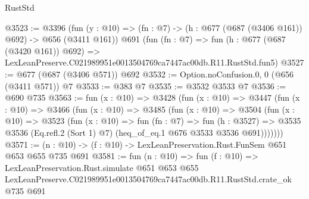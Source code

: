 \begin{lexlean}{RustStd}
\begin{coremodule}
@3523 := @3396
    (fun (y : @10) => (fn : @7) -> (h : @677 (@687 (@3406 @161)) @692) -> @656 (@3411 @161))
    @691
    (fun (fn : @7) =>
    fun (h : @677 (@687 (@3420 @161)) @692) =>
    LexLeanPreserve.C021989951e0013504769ca7447ac00db.R11.RustStd.fun5)
@3527 := @677 (@687 (@3406 @571)) @692
@3532 := Option.noConfusion.{0, 0} (@656 (@3411 @571)) @7
@3533 := @383 @7
@3535 := @3532 @3533 @7
@3536 := @690 @735
@3563 := fun (x : @10) =>
  @3428
    (fun (x : @10) =>
    @3447
      (fun (x : @10) =>
      @3466
        (fun (x : @10) =>
        @3485
          (fun (x : @10) =>
          @3504
            (fun (x : @10) =>
            @3523
              (fun (x : @10) =>
              fun (fn : @7) =>
              fun (h : @3527) =>
              @3535 @3536 (Eq.refl.{2} (Sort 1) @7) (heq_of_eq.{1} @676 @3533 @3536 @691)))))))
@3571 := (n : @10) -> (f : @10) -> LexLeanPreservation.Rust.FunSem @651 @653 @655 @735 @691
@3581 := fun (n : @10) =>
  fun (f : @10) =>
  LexLeanPreservation.Rust.simulate
    @651
    @653
    @655
    LexLeanPreserve.C021989951e0013504769ca7447ac00db.R11.RustStd.crate_ok
    @735
    @691
\end{coremodule}
\end{lexlean}
